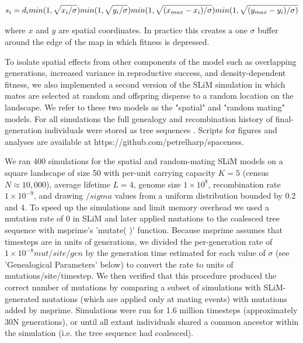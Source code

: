 \documentclass[11pt,twoside,lineno]{preprint}
\newif\ifcomments
\newcommand{\ak}[1]{\ifcomments{{\color{red} \it (#1)}}\else{}\fi}
\begin{document}
\begin{equation}
    s_{i}=d_{i} min(1,\sqrt{x_{i}/\sigma})
    min(1,\sqrt{y_{i}/\sigma})\\
    min(1,\sqrt{(x_{max}-x_{i})/\sigma})
    min(1,\sqrt{(y_{max}-y_{i})/\sigma)}
\end{equation}

where $x$ and $y$ are spatial coordinates. In practice this creates a one $\sigma$ buffer around the edge of the map in which fitness is depressed.

To isolate spatial effects from other components of the model such as overlapping generations, increased variance in reproductive success, and density-dependent fitness, we  also implemented a second version of the SLiM simulation in which mates are selected at random and offspring disperse to a random location on the landscape. We refer to these two models as the "spatial" and "random mating" models. For all simulations the full genealogy and recombination history of final-generation individuals were stored as tree sequences \citep{Kelleher2018}. Scripts for figures and analyses are available at https://github.com/petrelharp/spaceness.  

We ran 400 simulations for the spatial and random-mating SLiM models on a square landscape of size 50 with per-unit carrying capacity $K=5$ (census $N \approx 10,000$), average lifetime $L=4$, genome size $1\times10^{8}$, recombination rate $1\times10^{-9}$, and drawing $/sigma$ values from a uniform distribution bounded by 0.2 and 4. To speed up the simulations and limit memory overhead we used a mutation rate of 0 in SLiM and later applied mutations to the coalesced tree sequence with msprime's 'mutate( )' function. Because msprime assumes that timesteps are in units of generations, we divided the per-generation rate of $1\times10^{-8} mut/site/gen$ by the generation time estimated for each value of $\sigma$ (see 'Genealogical Parameters' below) to convert the rate to units of mutations/site/timestep. We then verified that this procedure produced the correct number of mutations by comparing a subset of simulations with SLiM-generated mutations (which are applied only at mating events) with mutations added by msprime. Simulations were run for 1.6 million timesteps (approximately 30N generations), or until all extant individuals shared a common ancestor within the simulation (i.e. the tree sequence had coalesced). \ak{maybe worth including a table with some basic runtime results in the supplement?}
\end{document}

